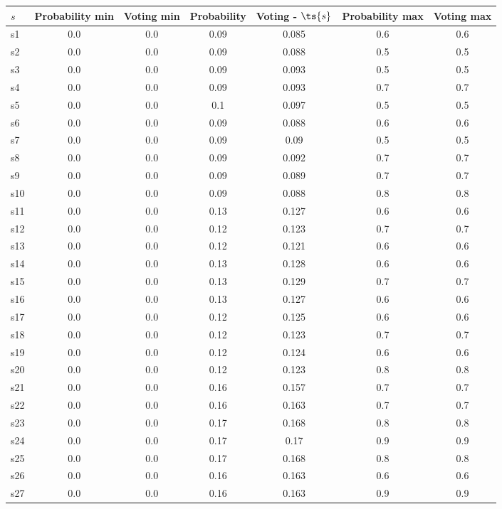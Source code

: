 \documentclass{article}
\begin{document}
\noindent\begin{tabular}{|l|c|c|c|c|c|c|}
\hline
$s$& Probability min & Voting min & Probability & Voting - $\ts{s}$ & Probability max & Voting max\\
\hline
s1 &0.0 & 0.0 & 0.09 & 0.085 & 0.6 & 0.6\\
\hline
s2 &0.0 & 0.0 & 0.09 & 0.088 & 0.5 & 0.5\\
\hline
s3 &0.0 & 0.0 & 0.09 & 0.093 & 0.5 & 0.5\\
\hline
s4 &0.0 & 0.0 & 0.09 & 0.093 & 0.7 & 0.7\\
\hline
s5 &0.0 & 0.0 & 0.1 & 0.097 & 0.5 & 0.5\\
\hline
s6 &0.0 & 0.0 & 0.09 & 0.088 & 0.6 & 0.6\\
\hline
s7 &0.0 & 0.0 & 0.09 & 0.09 & 0.5 & 0.5\\
\hline
s8 &0.0 & 0.0 & 0.09 & 0.092 & 0.7 & 0.7\\
\hline
s9 &0.0 & 0.0 & 0.09 & 0.089 & 0.7 & 0.7\\
\hline
s10 &0.0 & 0.0 & 0.09 & 0.088 & 0.8 & 0.8\\
\hline
s11 &0.0 & 0.0 & 0.13 & 0.127 & 0.6 & 0.6\\
\hline
s12 &0.0 & 0.0 & 0.12 & 0.123 & 0.7 & 0.7\\
\hline
s13 &0.0 & 0.0 & 0.12 & 0.121 & 0.6 & 0.6\\
\hline
s14 &0.0 & 0.0 & 0.13 & 0.128 & 0.6 & 0.6\\
\hline
s15 &0.0 & 0.0 & 0.13 & 0.129 & 0.7 & 0.7\\
\hline
s16 &0.0 & 0.0 & 0.13 & 0.127 & 0.6 & 0.6\\
\hline
s17 &0.0 & 0.0 & 0.12 & 0.125 & 0.6 & 0.6\\
\hline
s18 &0.0 & 0.0 & 0.12 & 0.123 & 0.7 & 0.7\\
\hline
s19 &0.0 & 0.0 & 0.12 & 0.124 & 0.6 & 0.6\\
\hline
s20 &0.0 & 0.0 & 0.12 & 0.123 & 0.8 & 0.8\\
\hline
s21 &0.0 & 0.0 & 0.16 & 0.157 & 0.7 & 0.7\\
\hline
s22 &0.0 & 0.0 & 0.16 & 0.163 & 0.7 & 0.7\\
\hline
s23 &0.0 & 0.0 & 0.17 & 0.168 & 0.8 & 0.8\\
\hline
s24 &0.0 & 0.0 & 0.17 & 0.17 & 0.9 & 0.9\\
\hline
s25 &0.0 & 0.0 & 0.17 & 0.168 & 0.8 & 0.8\\
\hline
s26 &0.0 & 0.0 & 0.16 & 0.163 & 0.6 & 0.6\\
\hline
s27 &0.0 & 0.0 & 0.16 & 0.163 & 0.9 & 0.9\\

\end{tabular}
\end{document}
